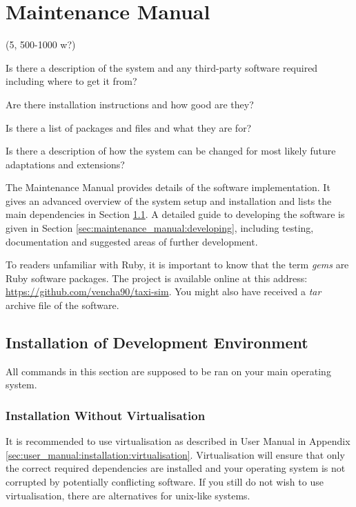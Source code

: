 \clearpage
\section{Maintenance Manual}
\label{sec:maintenance_manual}

(5, 500-1000 w?)

Is there a description of the system and any third-party software required
including where to get it from?

Are there installation instructions and how good are they?

Is there a list of packages and files and what they are for?

Is there a description of how the system can be changed for most likely future
adaptations and extensions?


The Maintenance Manual provides details of the software implementation. It
gives an advanced overview of the system setup and installation and lists the
main dependencies in Section \ref{sec:maintenance_manual:installation}. A
detailed guide to developing the software is given in Section
\ref{sec:maintenance_manual:developing}, including testing, documentation and
suggested areas of further development.


 To readers unfamiliar with Ruby, it is important to know that the term
\textit{gems} are Ruby software packages. The project is available online at
this address: \url{https://github.com/vencha90/taxi-sim}. You might also have
received a \textit{tar} archive file of the software.

\subsection{Installation of Development Environment}
\label{sec:maintenance_manual:installation}

All commands in this section are supposed to be ran on your main operating
system.


\subsubsection{Installation Without Virtualisation}
\label{sec:maintenance_manual:native_install}

It is recommended to use virtualisation as described in User Manual in Appendix
\ref{sec:user_manual:installation:virtualisation}. Virtualisation will ensure
that only the correct required dependencies are installed and your operating
system is not corrupted by potentially conflicting software. If you still do
not wish to use virtualisation, there are alternatives for unix-like systems.

